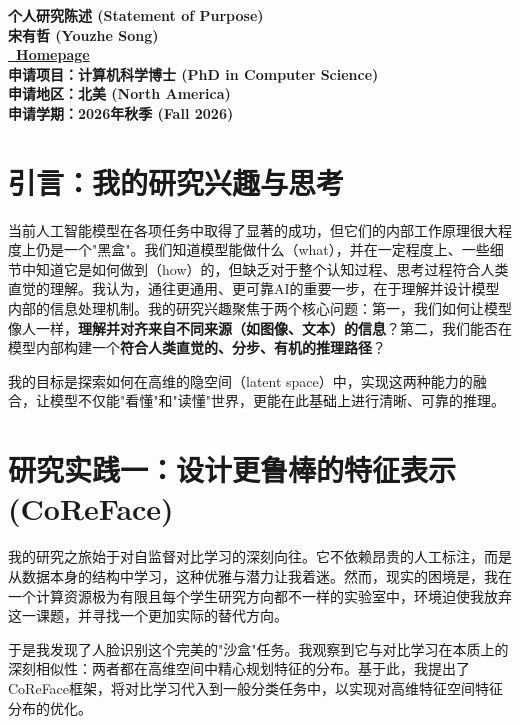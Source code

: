 \documentclass[11pt, letterpaper]{article}
\begin{document}
\begin{center}
    \fontsize{16pt}{18pt}\selectfont\bfseries
    个人研究陈述 (Statement of Purpose) \\[8pt]
    \large 宋有哲 (Youzhe Song) \\[4pt]
    \normalsize \href{https://isidoresong.github.io/}{\faHome\ Homepage} \\
    \normalsize 申请项目：计算机科学博士 (PhD in Computer Science) \\
    \normalsize 申请地区：北美 (North America) \\
    \normalsize 申请学期：2026年秋季 (Fall 2026)
\end{center}
\vspace{1em} %


\section{引言：我的研究兴趣与思考}

当前人工智能模型在各项任务中取得了显著的成功，但它们的内部工作原理很大程度上仍是一个"黑盒"。我们知道模型能做什么（what），并在一定程度上、一些细节中知道它是如何做到（how）的，但缺乏对于整个认知过程、思考过程符合人类直觉的理解。我认为，通往更通用、更可靠AI的重要一步，在于理解并设计模型内部的信息处理机制。我的研究兴趣聚焦于两个核心问题：第一，我们如何让模型像人一样，\textbf{理解并对齐来自不同来源（如图像、文本）的信息}？第二，我们能否在模型内部构建一个\textbf{符合人类直觉的、分步、有机的推理路径}？

我的目标是探索如何在高维的隐空间（latent space）中，实现这两种能力的融合，让模型不仅能"看懂"和"读懂"世界，更能在此基础上进行清晰、可靠的推理。

\section{研究实践一：设计更鲁棒的特征表示 (CoReFace)\cite{coreface}}

我的研究之旅始于对自监督对比学习的深刻向往。它不依赖昂贵的人工标注，而是从数据本身的结构中学习，这种优雅与潜力让我着迷。然而，现实的困境是，我在一个计算资源极为有限且每个学生研究方向都不一样的实验室中，环境迫使我放弃这一课题，并寻找一个更加实际的替代方向。

于是我发现了人脸识别这个完美的"沙盒"任务。我观察到它与对比学习在本质上的深刻相似性：两者都在高维空间中精心规划特征的分布。基于此，我提出了CoReFace框架，将对比学习代入到一般分类任务中，以实现对高维特征空间特征分布的优化。
\end{document}
